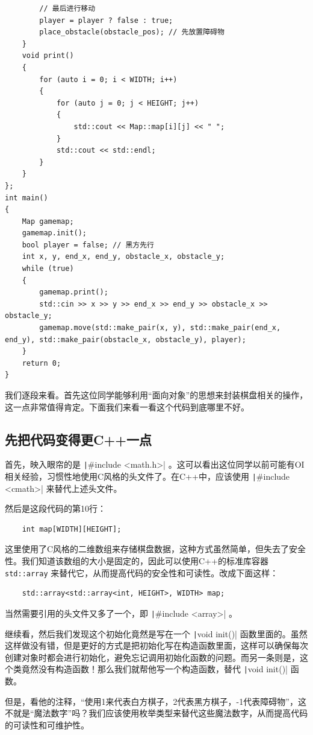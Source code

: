 \begin{verbatim}
        // 最后进行移动
        player = player ? false : true;
        place_obstacle(obstacle_pos); // 先放置障碍物
    }
    void print()
    {
        for (auto i = 0; i < WIDTH; i++)
        {
            for (auto j = 0; j < HEIGHT; j++)
            {
                std::cout << Map::map[i][j] << " ";
            }
            std::cout << std::endl;
        }
    }
};
int main()
{
    Map gamemap;
    gamemap.init();
    bool player = false; // 黑方先行
    int x, y, end_x, end_y, obstacle_x, obstacle_y;
    while (true)
    {
        gamemap.print();
        std::cin >> x >> y >> end_x >> end_y >> obstacle_x >> obstacle_y;
        gamemap.move(std::make_pair(x, y), std::make_pair(end_x, end_y), std::make_pair(obstacle_x, obstacle_y), player);
    }
    return 0;
}
\end{verbatim}

我们逐段来看。首先这位同学能够利用“面向对象”的思想来封装棋盘相关的操作，这一点非常值得肯定。下面我们来看一看这个代码到底哪里不好。

\subsection{先把代码变得更C++一点}

首先，映入眼帘的是 \texttt|#include <math.h>| 。这可以看出这位同学以前可能有OI相关经验，习惯性地使用C风格的头文件了。在C++中，应该使用 \texttt|#include <cmath>| 来替代上述头文件。

然后是这段代码的第10行：
\begin{verbatim}
    int map[WIDTH][HEIGHT];
\end{verbatim}
这里使用了C风格的二维数组来存储棋盘数据，这种方式虽然简单，但失去了安全性。我们知道该数组的大小是固定的，因此可以使用C++的标准库容器 \texttt{std::array} 来替代它，从而提高代码的安全性和可读性。改成下面这样：
\begin{verbatim}
    std::array<std::array<int, HEIGHT>, WIDTH> map;
\end{verbatim}
当然需要引用的头文件又多了一个，即 \texttt|#include <array>| 。

继续看，然后我们发现这个初始化竟然是写在一个 \texttt|void init()| 函数里面的。虽然这样做没有错，但是更好的方式是把初始化写在构造函数里面，这样可以确保每次创建对象时都会进行初始化，避免忘记调用初始化函数的问题。而另一条则是，这个类竟然没有构造函数！那么我们就帮他写一个构造函数，替代 \texttt|void init()| 函数。

但是，看他的注释，“使用1来代表白方棋子，2代表黑方棋子，-1代表障碍物”，这不就是“魔法数字”吗？我们应该使用枚举类型来替代这些魔法数字，从而提高代码的可读性和可维护性。

